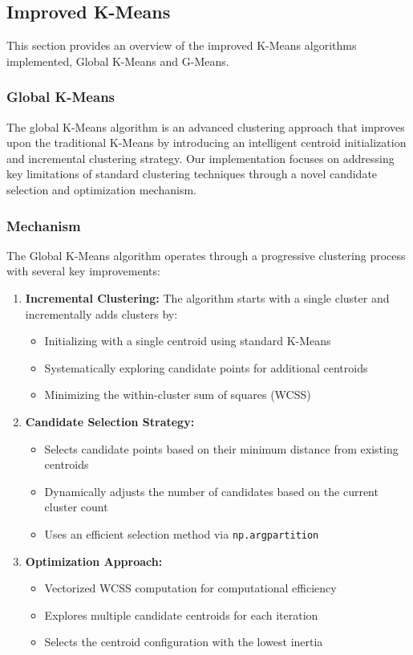 \subsection{Improved K-Means}
\label{subsec:methods-improved-kmeans}

This section provides an overview of the improved K-Means algorithms implemented, Global K-Means and G-Means.

\subsubsection{Global K-Means}
\label{subsec:globalkmeansdiscussion}

The global K-Means algorithm is an advanced clustering approach that improves upon the
traditional K-Means by introducing an intelligent centroid initialization and incremental clustering strategy.
Our implementation focuses on addressing key limitations of standard clustering techniques
through a novel candidate selection and optimization mechanism.

\subsubsection*{Mechanism}
The Global K-Means algorithm operates through a progressive clustering process with several key improvements:

\begin{enumerate}
    \item \textbf{Incremental Clustering:} The algorithm starts with a single cluster and incrementally adds clusters by:
    \begin{itemize}
        \item Initializing with a single centroid using standard K-Means
        \item Systematically exploring candidate points for additional centroids
        \item Minimizing the within-cluster sum of squares (WCSS)
    \end{itemize}
    \item \textbf{Candidate Selection Strategy:} 
    \begin{itemize}
        \item Selects candidate points based on their minimum distance from existing centroids
        \item Dynamically adjusts the number of candidates based on the current cluster count
        \item Uses an efficient selection method via \texttt{np.argpartition}
    \end{itemize}
    \item \textbf{Optimization Approach:}
    \begin{itemize}
        \item Vectorized WCSS computation for computational efficiency
        \item Explores multiple candidate centroids for each iteration
        \item Selects the centroid configuration with the lowest inertia
    \end{itemize}
\end{enumerate}

